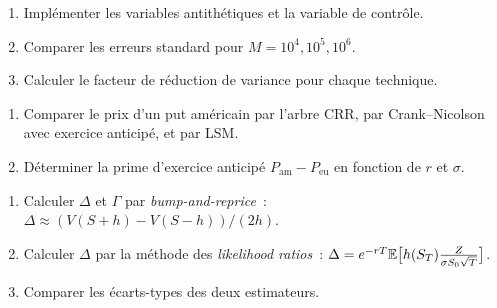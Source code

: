 \begin{exercice}
\begin{enumerate}
    \item Impl\'ementer les variables antith\'etiques et la variable de
          contr\^ole.
    \item Comparer les erreurs standard pour $M = 10^4, 10^5, 10^6$.
    \item Calculer le facteur de r\'eduction de variance pour chaque
          technique.
\end{enumerate}
\end{exercice}

\begin{exercice}
\begin{enumerate}
    \item Comparer le prix d'un put am\'ericain par l'arbre CRR, par
          Crank--Nicolson avec exercice anticip\'e, et par LSM.
    \item D\'eterminer la prime d'exercice anticip\'e
          $P_{\text{am}} - P_{\text{eu}}$ en fonction de $r$ et $\sigma$.
\end{enumerate}
\end{exercice}

\begin{exercice}
\begin{enumerate}
    \item Calculer $\Delta$ et $\Gamma$ par \textit{bump-and-reprice}~:
          $\Delta \approx (V(S+h) - V(S-h))/(2h)$.
    \item Calculer $\Delta$ par la m\'ethode des \textit{likelihood ratios}~:
          $\Delta = e^{-rT}\mathbb{E}\bigl[h(S_T)\frac{Z}{\sigma S_0\sqrt{T}}\bigr]$.
    \item Comparer les \'ecarts-types des deux estimateurs.
\end{enumerate}
\end{exercice}

